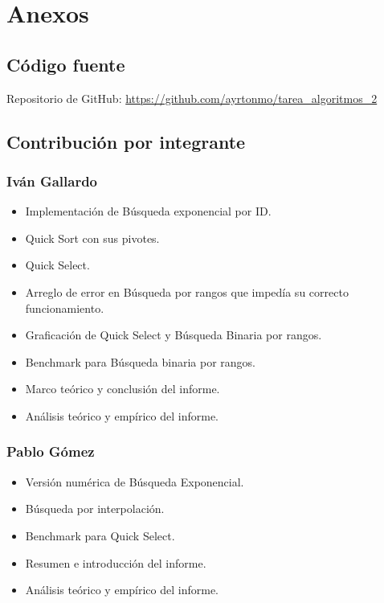 \chapter{Anexos}

\section{Código fuente}
Repositorio de GitHub: \url{https://github.com/ayrtonmo/tarea_algoritmos_2}

\section{Contribución por integrante}
\subsection{Iván Gallardo}
\begin{itemize}
    \item Implementación de Búsqueda exponencial por ID.
    \item Quick Sort con sus pivotes.
    \item Quick Select.
    \item Arreglo de error en Búsqueda por rangos que impedía su correcto funcionamiento.
    \item Graficación de Quick Select y Búsqueda Binaria por rangos.
    \item Benchmark para Búsqueda binaria por rangos.
    \item Marco teórico y conclusión del informe.
    \item Análisis teórico y empírico del informe.
\end{itemize}

\subsection{Pablo Gómez}
\begin{itemize}
    \item Versión numérica de Búsqueda Exponencial.
    \item Búsqueda por interpolación.
    \item Benchmark para Quick Select.
    \item Resumen e introducción del informe.
    \item Análisis teórico y empírico del informe.
\end{itemize}

